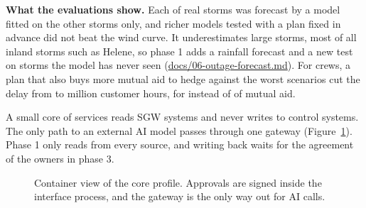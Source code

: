 \documentclass[fontsize=10pt,a4paper,DIV=12,parskip=half-,numbers=noenddot,headsepline,captions=tableheading]{scrartcl}
\begin{document}
\textbf{What the evaluations show.} Each of  real storms was forecast by a model fitted on the other storms only, and richer models tested with a plan fixed in advance did not beat the wind curve. It underestimates large storms, most of all inland storms such as Helene, so phase 1 adds a rainfall forecast and a new test on storms the model has never seen (\url{docs/06-outage-forecast.md}). For crews, a plan that also buys more mutual aid to hedge against the worst scenarios cut the delay from  to  million customer hours, for  instead of  of mutual aid.

A small core of services reads SGW systems and never writes to control systems. The only path to an external AI model passes through one gateway (Figure~\ref{fig:container}). Phase 1 only reads from every source, and writing back waits for the agreement of the owners in phase 3.

\begin{figure}[H]
  \centering
  \resizebox{0.8\textwidth}{!}{}
  \caption{Container view of the core profile. Approvals are signed inside the interface process, and the gateway is the only way out for AI calls.}
  \label{fig:container}
\end{figure}
\end{document}
